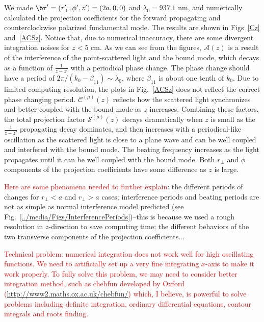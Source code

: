 We made $ \br'=(r'_\perp,\phi',z')=(2a,0,0) $ and $ \lambda_0=937.1 $ nm, and numerically calculated the projection coefficients for the forward propagating and counterclockwise polarized fundamental mode. The results are shown in Figs~\ref{Cz} and~\ref{ACSz}. Notice that, due to numerical inaccuracy, there are some divergent integration noises for $ z<5 $ cm. As we can see from the figures, $ \mathcal{A}(z) $ is a result of the interference of the point-scattered light and the bound mode, which decays as a function of $ \frac{1}{z-z'} $ with a periodical phase change. The phase change should have a period of $ 2\pi/(k_0-\beta_{11})\sim \lambda_0 $, where $ \beta_{11} $ is about one tenth of $ k_0 $. Due to limited computing resolution, the plots in Fig.~\ref{ACSz} does not reflect the correct phase changing period. $ \mathcal{C}^{(\mu)}(z) $ reflects how the scattered light synchronizes and better coupled with the bound mode as $ z $ increases. Combining these factors, the total projection factor $ \mathcal{S}^{(\mu)}(z) $ decays dramatically when $ z $ is small as the $ \frac{1}{z-z'} $ propagating decay dominates, and then increases with a periodical-like oscillation as the scattered light is close to a plane wave and can be well coupled and interfered with the bound mode. The beating frequency increases as the light propagates until it can be well coupled with the bound mode. Both $ r_\perp $ and $ \phi $ components of the projection coefficients have some difference as $ z $ is large. 

\textcolor{red}{Here are some phenomena needed to further explain}: the different periods of changes for $ r_\perp< a $ and $ r_\perp>a $ cases; interference periods and beating periods are not as simple as normal interference model predicted (see Fig.~\ref{../media/Figs/InterferencePeriods})--this is because we used a rough resolution in $ z $-direction to save computing time; the different behaviors of the two transverse components of the projection coefficients...

\textcolor{red}{Technical problem: numerical integration does not work well for high oscillating functions. We need to artificially set up a very fine integrating $ x $-axis to make it work properly. To fully solve this problem, we may need to consider better integration method, such as chebfun developed by Oxford (\url{http://www2.maths.ox.ac.uk/chebfun/}) which, I believe, is powerful to solve problems including definite integration, ordinary differential equations, contour integrals and roots finding. }

